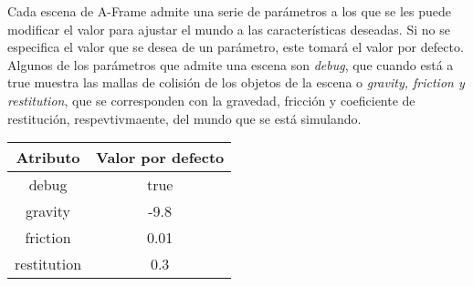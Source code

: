 Cada escena de A-Frame admite una serie de parámetros a los que se les puede modificar el valor para ajustar el mundo a las características deseadas. Si no se especifica el valor que se desea de un parámetro, este tomará el valor por defecto. Algunos de los parámetros que admite una escena son \textit{debug}, que cuando está a true muestra las mallas de colisión de los objetos de la escena o \textit{gravity, friction y restitution}, que se corresponden con la gravedad, fricción y coeficiente de restitución, respevtivmaente, del mundo que se está simulando.
\begin{table}[h!]
\centering
\begin{tabular}{|c|c|}
\hline
\textbf{Atributo}    & \textbf{Valor por defecto} \\ \hline
debug       & true              \\ \hline
gravity     & -9.8              \\ \hline
friction    & 0.01              \\ \hline
restitution & 0.3               \\ \hline
\end{tabular}
\end{table}
